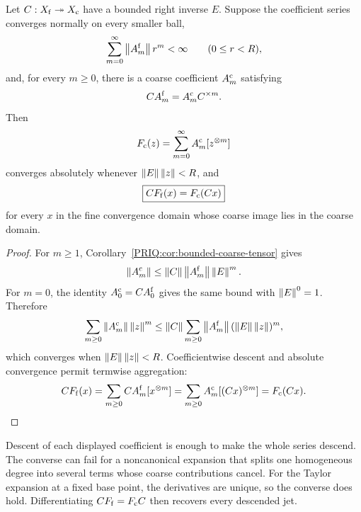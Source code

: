 \begin{PRIQtheorem}\label{PRIQ:thm:analytic-descent}
Let $C:X_{\mathrm f}\twoheadrightarrow X_{\mathrm c}$ have a bounded right inverse $E$.  Suppose the coefficient series converges normally on every smaller ball,
\begin{equation}\label{PRIQ:eq:fine-normal-summability}
  \sum_{m=0}^{\infty}\left\lVert A_m^{\mathrm f}\right\rVert r^m<\infty
  \qquad(0\leq r<R),
\end{equation}
and, for every $m\geq0$, there is a coarse coefficient $A_m^{\mathrm c}$ satisfying
\begin{equation}\label{PRIQ:eq:coefficientwise-descent}
  CA_m^{\mathrm f}=A_m^{\mathrm c}C^{\times m}.
\end{equation}
Then
\begin{equation}\label{PRIQ:eq:coarse-analytic-field}
  F_{\mathrm c}(z)
  =
  \sum_{m=0}^{\infty}A_m^{\mathrm c}[z^{\otimes m}]
\end{equation}
converges absolutely whenever $\left\lVert E\right\rVert\left\lVert z\right\rVert<R$, and
\begin{equation}\label{PRIQ:eq:analytic-field-intertwining}
  \boxed{CF_{\mathrm f}(x)=F_{\mathrm c}(Cx)}
\end{equation}
for every $x$ in the fine convergence domain whose coarse image lies in the coarse domain.
\end{PRIQtheorem}

\begin{proof}
For $m\geq1$, Corollary~\ref{PRIQ:cor:bounded-coarse-tensor} gives
\[
  \left\lVert A_m^{\mathrm c}\right\rVert
  \leq
  \left\lVert C\right\rVert\left\lVert A_m^{\mathrm f}\right\rVert\left\lVert E\right\rVert^m.
\]
For $m=0$, the identity $A_0^{\mathrm c}=CA_0^{\mathrm f}$ gives the same bound with $\left\lVert E\right\rVert^0=1$.
Therefore
\[
  \sum_{m\geq0}\left\lVert A_m^{\mathrm c}\right\rVert\left\lVert z\right\rVert^m
  \leq
  \left\lVert C\right\rVert
  \sum_{m\geq0}
  \left\lVert A_m^{\mathrm f}\right\rVert
  (\left\lVert E\right\rVert\left\lVert z\right\rVert)^m,
\]
which converges when $\left\lVert E\right\rVert\left\lVert z\right\rVert<R$.  Coefficientwise descent and absolute convergence permit termwise aggregation:
\[
  CF_{\mathrm f}(x)
  =\sum_{m\geq0}CA_m^{\mathrm f}[x^{\otimes m}]
  =\sum_{m\geq0}A_m^{\mathrm c}[(Cx)^{\otimes m}]
  =F_{\mathrm c}(Cx).
\]
\end{proof}

\begin{PRIQremark}
Descent of each displayed coefficient is enough to make the whole series descend.  The converse can fail for a noncanonical expansion that splits one homogeneous degree into several terms whose coarse contributions cancel.  For the Taylor expansion at a fixed base point, the derivatives are unique, so the converse does hold.  Differentiating $CF_{\mathrm f}=F_{\mathrm c}C$ then recovers every descended jet.
\end{PRIQremark}

